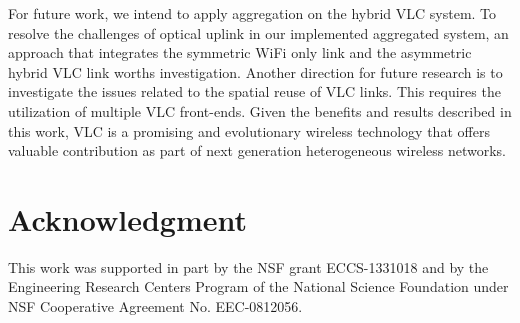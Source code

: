 \documentclass[10pt,journal]{IEEEtran}
\begin{document}
For future work, we intend to apply aggregation on the hybrid VLC system. To resolve the challenges of optical uplink in our implemented aggregated system, an approach that integrates the symmetric WiFi only link and the asymmetric hybrid VLC link worths investigation. Another direction for future research is to investigate the issues related to the spatial reuse of VLC links. This requires the utilization of multiple VLC front-ends. Given the benefits and results described in this work, VLC is a promising and evolutionary wireless technology that offers valuable contribution as part of next generation heterogeneous wireless networks.


\section*{Acknowledgment}
This work was supported in part by the NSF grant ECCS-1331018 and by the Engineering Research Centers Program of the National Science Foundation under NSF Cooperative Agreement No. EEC-0812056.



\end{document}
